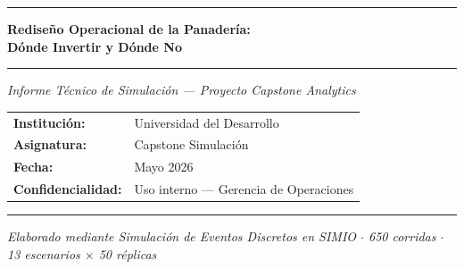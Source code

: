 \documentclass[10pt, a4paper]{article}
\begin{document}
\begin{titlepage}
  \centering
  \vspace*{1.5cm}

  {\color{azulUDD}\rule{\linewidth}{1.5pt}}
  \vspace{0.4cm}

  {\LARGE\bfseries\color{azulUDD}
    Redise\~no Operacional de la Panader\'ia:\\[6pt]
    D\'onde Invertir y D\'onde No
  }

  \vspace{0.3cm}
  {\color{azulUDD}\rule{\linewidth}{0.8pt}}
  \vspace{0.6cm}

  {\large\itshape Informe T\'ecnico de Simulaci\'on --- Proyecto Capstone Analytics}

  \vspace{1.2cm}

  {\normalsize
    \begin{tabular}{ll}
      \textbf{Instituci\'on:}       & Universidad del Desarrollo \\[4pt]
      \textbf{Asignatura:}          & Capstone Simulaci\'on \\[4pt]
      \textbf{Fecha:}               & Mayo 2026 \\[4pt]
      \textbf{Confidencialidad:}    & Uso interno --- Gerencia de Operaciones \\
    \end{tabular}
  }

  \vspace{2cm}


  \vfill

  {\color{azulUDD}\rule{\linewidth}{1.5pt}}
  {\small \textit{Elaborado mediante Simulaci\'on de Eventos Discretos en SIMIO
    $\cdot$ 650 corridas $\cdot$ 13 escenarios $\times$ 50 r\'eplicas}}
\end{titlepage}
\end{document}
